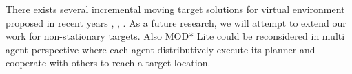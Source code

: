 \documentclass[10pt,journal]{IEEEtran}
\begin{document}
There exists several incremental moving target solutions for virtual environment proposed in recent years \cite{Sun:2009}, \cite{GFR-A*Sun:2010}, \cite{MT-D*Lite:2010}. As a future research, we will attempt to extend our work for non-stationary targets. Also MOD* Lite could be reconsidered in multi agent perspective where each agent distributively execute its planner and cooperate with others to reach a target location. 

{}

\end{document}
